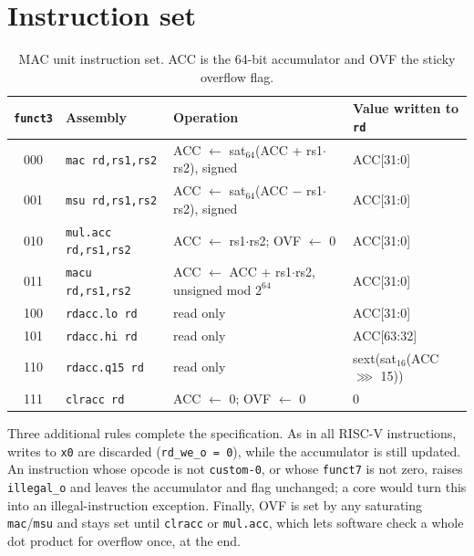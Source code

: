 \documentclass[11pt,a4paper]{report}
\newcommand{\code}[1]{\texttt{#1}}
\begin{document}
\section{Instruction set}
\begin{table}[H]
  \centering
  \caption{MAC unit instruction set. ACC is the 64-bit accumulator and OVF the sticky overflow flag.}
  \label{tab:isa}
  \small
  \begin{tabular}{@{}clll@{}}
    \toprule
    \code{funct3} & Assembly & Operation & Value written to \code{rd} \\
    \midrule
    000 & \code{mac rd,rs1,rs2}     & ACC $\leftarrow$ sat$_{64}$(ACC + rs1$\cdot$rs2), signed & ACC[31:0] \\
    001 & \code{msu rd,rs1,rs2}     & ACC $\leftarrow$ sat$_{64}$(ACC $-$ rs1$\cdot$rs2), signed & ACC[31:0] \\
    010 & \code{mul.acc rd,rs1,rs2} & ACC $\leftarrow$ rs1$\cdot$rs2; OVF $\leftarrow$ 0 & ACC[31:0] \\
    011 & \code{macu rd,rs1,rs2}    & ACC $\leftarrow$ ACC + rs1$\cdot$rs2, unsigned mod $2^{64}$ & ACC[31:0] \\
    100 & \code{rdacc.lo rd}        & read only & ACC[31:0] \\
    101 & \code{rdacc.hi rd}        & read only & ACC[63:32] \\
    110 & \code{rdacc.q15 rd}       & read only & sext(sat$_{16}$(ACC $\ggg$ 15)) \\
    111 & \code{clracc rd}          & ACC $\leftarrow$ 0; OVF $\leftarrow$ 0 & 0 \\
    \bottomrule
  \end{tabular}
\end{table}

\noindent Three additional rules complete the specification. As in all RISC-V
instructions, writes to \code{x0} are discarded (\code{rd\_we\_o = 0}), while
the accumulator is still updated. An instruction whose opcode is not
\code{custom-0}, or whose \code{funct7} is not zero, raises \code{illegal\_o}
and leaves the accumulator and flag unchanged; a core would turn this into an
illegal-instruction exception. Finally, OVF is set by any saturating
\code{mac}/\code{msu} and stays set until \code{clracc} or \code{mul.acc}, which
lets software check a whole dot product for overflow once, at the end.
\end{document}
